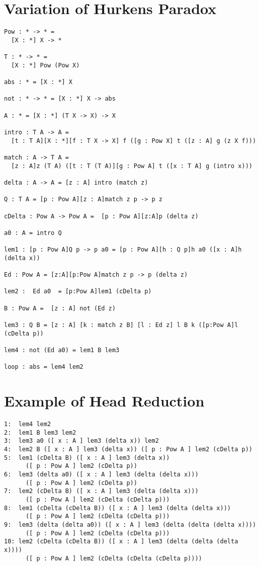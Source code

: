 \section{Variation of Hurkens Paradox} \label{apdix:loop}
\begin{Verbatim}[fontsize=\small]
Pow : * -> * =
  [X : *] X -> *

T : * -> * =
  [X : *] Pow (Pow X)

abs : * = [X : *] X

not : * -> * = [X : *] X -> abs

A : * = [X : *] (T X -> X) -> X

intro : T A -> A =
  [t : T A][X : *][f : T X -> X] f ([g : Pow X] t ([z : A] g (z X f)))

match : A -> T A =
  [z : A]z (T A) ([t : T (T A)][g : Pow A] t ([x : T A] g (intro x)))

delta : A -> A = [z : A] intro (match z)

Q : T A = [p : Pow A][z : A]match z p -> p z

cDelta : Pow A -> Pow A =  [p : Pow A][z:A]p (delta z)

a0 : A = intro Q

lem1 : [p : Pow A]Q p -> p a0 = [p : Pow A][h : Q p]h a0 ([x : A]h (delta x))

Ed : Pow A = [z:A][p:Pow A]match z p -> p (delta z)

lem2 :  Ed a0  = [p:Pow A]lem1 (cDelta p)

B : Pow A =  [z : A] not (Ed z)

lem3 : Q B = [z : A] [k : match z B] [l : Ed z] l B k ([p:Pow A]l (cDelta p))

lem4 : not (Ed a0) = lem1 B lem3

loop : abs = lem4 lem2
\end{Verbatim}

\section{Example of Head Reduction}\label{apdix:hred}
\begin{Verbatim}[fontsize=\small]
1:  lem4 lem2
2:  lem1 B lem3 lem2  
3:  lem3 a0 ([ x : A ] lem3 (delta x)) lem2 
4:  lem2 B ([ x : A ] lem3 (delta x)) ([ p : Pow A ] lem2 (cDelta p))
5:  lem1 (cDelta B) ([ x : A ] lem3 (delta x))
      ([ p : Pow A ] lem2 (cDelta p))
6:  lem3 (delta a0) ([ x : A ] lem3 (delta (delta x)))
      ([ p : Pow A ] lem2 (cDelta p))
7:  lem2 (cDelta B) ([ x : A ] lem3 (delta (delta x)))
      ([ p : Pow A ] lem2 (cDelta (cDelta p)))
8:  lem1 (cDelta (cDelta B)) ([ x : A ] lem3 (delta (delta x)))
      ([ p : Pow A ] lem2 (cDelta (cDelta p)))
9:  lem3 (delta (delta a0)) ([ x : A ] lem3 (delta (delta (delta x))))
      ([ p : Pow A ] lem2 (cDelta (cDelta p)))
10: lem2 (cDelta (cDelta B)) ([ x : A ] lem3 (delta (delta (delta x))))
      ([ p : Pow A ] lem2 (cDelta (cDelta (cDelta p))))
\end{Verbatim}

